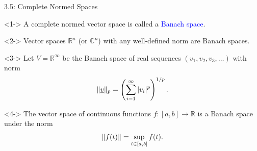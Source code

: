 \documentclass[10pt,english,aspectratio=169]{beamer}
\begin{document}
\begin{frame}{3.5: Complete Normed Spaces}


\begin{definition}<1->
A complete normed vector space is called a \textcolor{blue}{Banach space}.
\end{definition}

\begin{example}<2->
Vector spaces $\mathbb{R}^n$ (or $\mathbb{C}^n$) with any well-defined norm are Banach spaces.
\end{example}

\begin{example}<3->
Let $V = \mathbb{R}^\infty$ be the Banach space of real sequences $(v_1,v_2,v_3,\ldots)$ with norm \vspace{-3mm}
\[ \|\underline{v} \|_p = \left(\sum_{i=1}^\infty |v_i |^p \right)^{1/p}. \]
\end{example}


\begin{example}<4->
The vector space of continuous functions $f \colon [a,b] \to \mathbb{R}$ is a Banach space under the norm \vspace{-2.5mm}
\[ \left\| f(t) \right\| = \sup_{t\in [a,b]} f(t). \vspace*{-0.5mm}\]
\end{example}

\end{frame}
\end{document}
